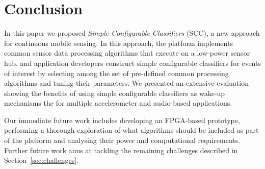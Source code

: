 \section{Conclusion}
\label{sec:conclusion}

In this paper we proposed {\em Simple Configurable Classifiers} (SCC),
a new approach for continuous mobile sensing.  In this approach, the
platform implements common sensor data processing algorithms that
execute on a low-power sensor hub, and application developers
construct simple configurable classifiers for events of interest by
selecting among the set of pre-defined common processing
algorithms and tuning their parameters.  We presented an extensive 
evaluation showing the benefits of using simple configurable
classifiers as wake-up mechanisms the for multiple accelerometer and 
audio-based applications.

Our immediate future work includes developing an FPGA-based prototype,
performing a thorough exploration of what algorithms should 
be included as part of the platform and analysing their power and 
computational requirements.  Further future work aims at tackling 
the remaining challenges described in Section~\ref{sec:challenges}.  
